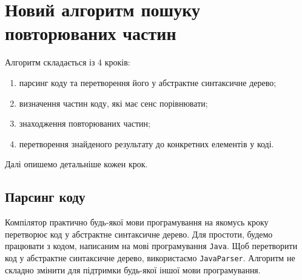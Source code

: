 \documentclass[a4paper, 14pt]{article}
\begin{document}
\section{Новий алгоритм пошуку повторюваних частин}
Алгоритм складається із 4 кроків:
\begin{enumerate}
\item парсинг коду та перетворення його у абстрактне синтаксичне дерево;
\item визначення частин коду, які має сенс порівнювати;
\item знаходження повторюваних частин;
\item перетворення знайденого результату до конкретних елементів у коді.
\end{enumerate}
Далі опишемо детальніше кожен крок.
\subsection{Парсинг коду}
Компілятор практично будь-якої мови програмування на якомусь кроку перетворює код у абстрактне синтаксичне дерево. Для простоти, будемо працювати з кодом, написаним на мові програмування \verb|Java|. Щоб перетворити код у абстрактне синтаксичне дерево, використаємо \verb|JavaParser|. Алгоритм не складно змінити для підтримки будь-якої іншої мови програмування.
\end{document}
